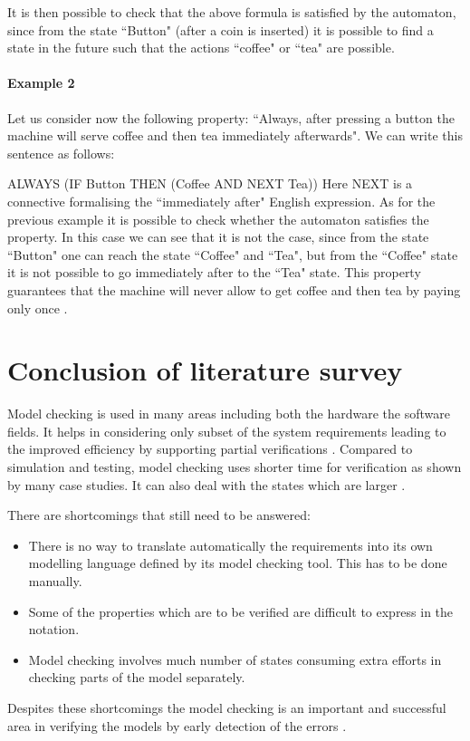 \documentclass[a4paper,12pt]{report}
\begin{document}
\begin{onehalfspacing}
It is then possible to check that the above formula is satisfied by the automaton, since from the state ``Button" (after a coin is inserted) it is possible to find a state in the future such that the actions ``coffee" or ``tea" are possible.
\paragraph{Example 2}
Let us consider now the following property: ``Always, after pressing a button the machine will serve coffee and then tea immediately afterwards". We can write this sentence as follows:

ALWAYS (IF Button THEN (Coffee AND NEXT Tea))
Here NEXT is a connective formalising the ``immediately after" English expression. As for the previous example it is possible to check whether the automaton satisfies the property. In this case we can see that it is not the case, since from the state ``Button" one can reach the state ``Coffee" and ``Tea", but from the ``Coffee" state it is not possible to go immediately after to the ``Tea" state. This property guarantees that the machine will never allow to get coffee and then tea by paying only once \cite{J.M.Wing1996}.

\section{Conclusion of literature survey}
\label{conclude literature survey}

Model checking is used in many areas including both the hardware the software fields. It helps in considering only subset of the system requirements leading to the improved efficiency by supporting partial verifications \cite{Palshikar2004}. Compared to simulation and testing, model checking uses shorter time for verification as shown by many case studies. It can also deal with the states which are larger \cite{Palshikar2004}.

There are shortcomings that still need to be answered:
\begin{itemize}
\item There is no way to translate automatically the requirements into its own modelling language defined by its model checking tool. This has to be done manually.
\item Some of the properties which are to be verified are difficult to express in the notation.
\item Model checking involves much number of states consuming extra efforts in checking parts of the model separately. 
\end{itemize}
Despites these shortcomings the model checking is an important and successful area in verifying the models by early detection of the errors \cite{Havelund2001}.



\end{onehalfspacing}
\end{document}

